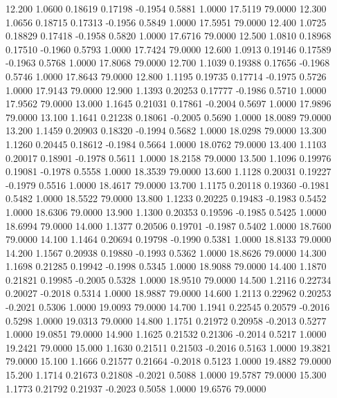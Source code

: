   12.200   1.0600   0.18619   0.17198  -0.1954   0.5881   1.0000  17.5119  79.0000
  12.300   1.0656   0.18715   0.17313  -0.1956   0.5849   1.0000  17.5951  79.0000
  12.400   1.0725   0.18829   0.17418  -0.1958   0.5820   1.0000  17.6716  79.0000
  12.500   1.0810   0.18968   0.17510  -0.1960   0.5793   1.0000  17.7424  79.0000
  12.600   1.0913   0.19146   0.17589  -0.1963   0.5768   1.0000  17.8068  79.0000
  12.700   1.1039   0.19388   0.17656  -0.1968   0.5746   1.0000  17.8643  79.0000
  12.800   1.1195   0.19735   0.17714  -0.1975   0.5726   1.0000  17.9143  79.0000
  12.900   1.1393   0.20253   0.17777  -0.1986   0.5710   1.0000  17.9562  79.0000
  13.000   1.1645   0.21031   0.17861  -0.2004   0.5697   1.0000  17.9896  79.0000
  13.100   1.1641   0.21238   0.18061  -0.2005   0.5690   1.0000  18.0089  79.0000
  13.200   1.1459   0.20903   0.18320  -0.1994   0.5682   1.0000  18.0298  79.0000
  13.300   1.1260   0.20445   0.18612  -0.1984   0.5664   1.0000  18.0762  79.0000
  13.400   1.1103   0.20017   0.18901  -0.1978   0.5611   1.0000  18.2158  79.0000
  13.500   1.1096   0.19976   0.19081  -0.1978   0.5558   1.0000  18.3539  79.0000
  13.600   1.1128   0.20031   0.19227  -0.1979   0.5516   1.0000  18.4617  79.0000
  13.700   1.1175   0.20118   0.19360  -0.1981   0.5482   1.0000  18.5522  79.0000
  13.800   1.1233   0.20225   0.19483  -0.1983   0.5452   1.0000  18.6306  79.0000
  13.900   1.1300   0.20353   0.19596  -0.1985   0.5425   1.0000  18.6994  79.0000
  14.000   1.1377   0.20506   0.19701  -0.1987   0.5402   1.0000  18.7600  79.0000
  14.100   1.1464   0.20694   0.19798  -0.1990   0.5381   1.0000  18.8133  79.0000
  14.200   1.1567   0.20938   0.19880  -0.1993   0.5362   1.0000  18.8626  79.0000
  14.300   1.1698   0.21285   0.19942  -0.1998   0.5345   1.0000  18.9088  79.0000
  14.400   1.1870   0.21821   0.19985  -0.2005   0.5328   1.0000  18.9510  79.0000
  14.500   1.2116   0.22734   0.20027  -0.2018   0.5314   1.0000  18.9887  79.0000
  14.600   1.2113   0.22962   0.20253  -0.2021   0.5306   1.0000  19.0093  79.0000
  14.700   1.1941   0.22545   0.20579  -0.2016   0.5298   1.0000  19.0313  79.0000
  14.800   1.1751   0.21972   0.20958  -0.2013   0.5277   1.0000  19.0851  79.0000
  14.900   1.1625   0.21532   0.21306  -0.2014   0.5217   1.0000  19.2421  79.0000
  15.000   1.1630   0.21511   0.21503  -0.2016   0.5163   1.0000  19.3821  79.0000
  15.100   1.1666   0.21577   0.21664  -0.2018   0.5123   1.0000  19.4882  79.0000
  15.200   1.1714   0.21673   0.21808  -0.2021   0.5088   1.0000  19.5787  79.0000
  15.300   1.1773   0.21792   0.21937  -0.2023   0.5058   1.0000  19.6576  79.0000
